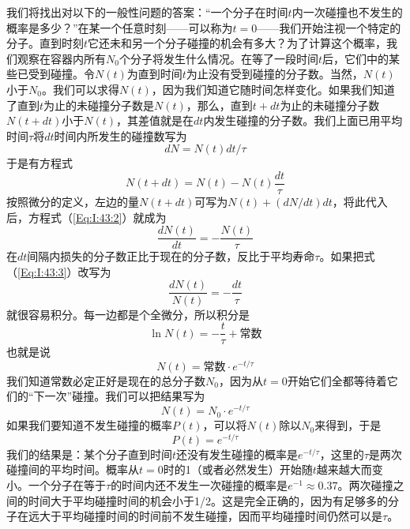 我们将找出对以下的一般性问题的答案：“一个分子在时间$t$内一次碰撞也不发生的概率是多少？”在某一个任意时刻——可以称为$t =0$——我们开始注视一个特定的分子。直到时刻$t$它还未和另一个分子碰撞的机会有多大？为了计算这个概率，我们观察在容器内所有$N_0$个分子将发生什么情况。在等了一段时间$t$后，它们中的某些已受到碰撞。令$N(t)$为直到时间$t$为止没有受到碰撞的分子数。当然，$N (t)$小于$N_0$。我们可以求得$N(t)$，因为我们知道它随时间怎样变化。如果我们知道了直到$t$为止的未碰撞分子数是$N(t)$，那么，直到$t+dt$为止的未碰撞分子数$N(t +dt)$小于$N(t)$，其差值就是在$dt$内发生碰撞的分子数。我们上面已用平均时间$\tau$将$dt$时间内所发生的碰撞数写为
\begin{equation*}
    dN=N(t)dt/\tau
\end{equation*}
于是有方程式
\begin{equation}
    \label{Eq:I:43:2}
    N(t+dt)=N(t)-N(t)\frac{dt}{\tau}
\end{equation}
按照微分的定义，左边的量$N(t+dt)$可写为$N(t)+(dN/dt)dt$，将此代入后，方程式（\ref{Eq:I:43:2}）就成为
\begin{equation}
    \label{Eq:I:43:3}
    \frac{dN(t)}{dt}=-\frac{N(t)}{\tau}
\end{equation}
在$dt$间隔内损失的分子数正比于现在的分子数，反比于平均寿命$\tau$。如果把式（\ref{Eq:I:43:3}）改写为
\begin{equation}
    \label{Eq:I:43:4}
    \frac{dN(t)}{N(t)}=-\frac{dt}{\tau}
\end{equation}
就很容易积分。每一边都是个全微分，所以积分是
\begin{equation}
    \label{Eq:I:43:5}
    \ln N(t) = -\frac{t}{\tau} + \text{常数}
\end{equation}
也就是说
\begin{equation}
    \label{Eq:I:43:6}
    N(t)=\text{常数}\cdot e^{- t/\tau}
\end{equation}
我们知道常数必定正好是现在的总分子数$N_0$，因为从$t =0$开始它们全都等待着它们的“下一次”碰撞。我们可以把结果写为
\begin{equation}
    \label{Eq:I:43:7}
    N(t)=N_0\cdot e^{- t/\tau}
\end{equation}
如果我们要知道不发生碰撞的概率$P(t)$，可以将$N(t)$除以$N_0$来得到，于是
\begin{equation}
    \label{Eq:I:43:8}
    P(t)=e^{-t/\tau}
\end{equation}
我们的结果是：某个分子直到时间$t$还没有发生碰撞的概率是$e^{-t/\tau}$，这里的$\tau$是两次碰撞间的平均时间。概率从$t =0$时的1（或者必然发生）开始随$t$越来越大而变小。一个分子在等于$\tau$的时间内还不发生一次碰撞的概率是$e^{-1}\approx 0.37$。两次碰撞之间的时间大于平均碰撞时间的机会小于1/2。这是完全正确的，因为有足够多的分子在远大于平均碰撞时间的时间前不发生碰撞，因而平均碰撞时间仍然可以是$\tau$。

